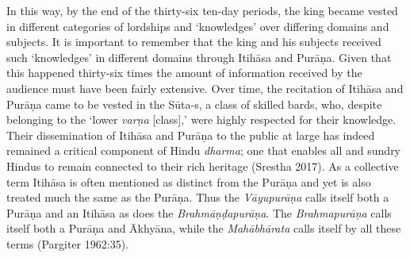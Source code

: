 In this way, by the end of the thirty-six ten-day periods, the king became vested in different categories of lordships and ‘knowledges’ over differing domains and subjects. It is important to remember that the king and his subjects received such ‘knowledges’ in different domains through Itihāsa and Purāṇa. Given that this happened thirty-six times the amount of information received by the audience must have been fairly extensive. Over time, the recitation of Itihāsa and Purāṇa came to be vested in the Sūta-s, a class of skilled bards, who, despite belonging to the ‘lower \textit{varṇa} [class],’ were highly respected for their knowledge. Their dissemination of Itihāsa and Purāṇa to the public at large has indeed remained a critical component of Hindu \textit{dharma}; one that enables all and sundry Hindus to remain connected to their rich heritage (Srestha 2017). As a collective term Itihāsa is often mentioned as distinct from the Purāṇa and yet is also treated much the same as the Purāṇa. Thus the \textit{Vāyupurāṇa} calls itself both a Purāṇa and an Itihāsa as does the \textit{Brahmāṇḍapurāṇa}. The \textit{Brahmapurāṇa} calls itself both a Purāṇa and Ākhyāna, while the \textit{Mahābhārata} calls itself by all these terms (Pargiter 1962:35). 

